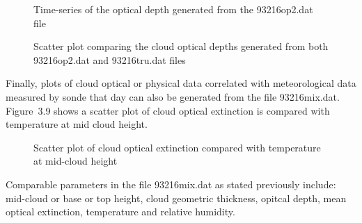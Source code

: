 \begin{figure}
\vspace{5.0in}
\caption{Time-series of the optical depth
generated from the 93216op2.dat file}
\end{figure}

\begin{figure}
\vspace{5.0in}
\caption{Scatter plot comparing the cloud 
optical depths generated from both 
93216op2.dat and 93216tru.dat files}
\end{figure}

Finally, plots of cloud optical or physical data correlated 
with meteorological data
measured by sonde that day can also be generated from the file
93216mix.dat. Figure~{3.9} shows
a scatter plot of cloud optical extinction is compared with temperature
at mid cloud height.

\begin{figure}
\vspace{5.0in}
\caption{Scatter plot of cloud optical extinction compared with temperature
at mid-cloud height}
\end{figure}

Comparable parameters in the file 93216mix.dat as stated previously
include: mid-cloud or base or top height, cloud geometric thickness,
opitcal depth, mean optical extinction, temperature and relative humidity.
